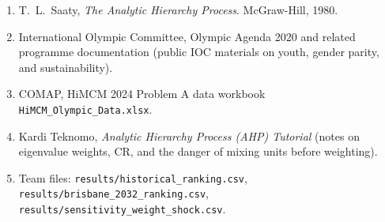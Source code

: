 \documentclass[12pt]{article}
\newcommand{\CR}{\mathrm{CR}}
\begin{document}
\begin{enumerate}
\item T.~L.~Saaty, \emph{The Analytic Hierarchy Process}. McGraw-Hill, 1980.
\item International Olympic Committee, Olympic Agenda 2020 and related programme
      documentation (public IOC materials on youth, gender parity, and sustainability).
\item COMAP, HiMCM 2024 Problem A data workbook \texttt{HiMCM\_Olympic\_Data.xlsx}.
\item Kardi Teknomo, \emph{Analytic Hierarchy Process (AHP) Tutorial} (notes on
      eigenvalue weights, \(\CR\), and the danger of mixing units before weighting).
\item Team files: \texttt{results/historical\_ranking.csv},
      \texttt{results/brisbane\_2032\_ranking.csv},
      \texttt{results/sensitivity\_weight\_shock.csv}.
\end{enumerate}
\end{document}
